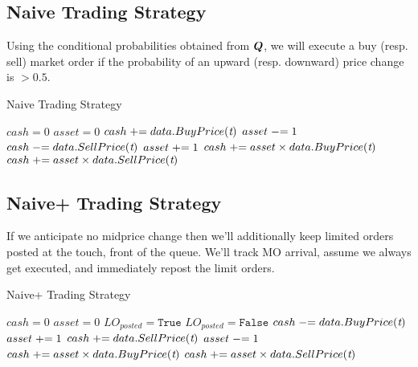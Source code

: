 \subsection{Naive Trading Strategy}  Using the conditional probabilities obtained from $\boldsymbol{Q}$, we will execute a buy (resp. sell) market order if the probability of an upward (resp. downward) price change is $> 0.5$.
\begin{algorithm}[H]
\caption{Naive Trading Strategy}
\begin{algorithmic}[1]
\State $cash = 0$
\State $asset = 0$
		\State $cash \mathrel{+}= data.BuyPrice(\textit{t})$
		\State $asset \mathrel{-}= 1$
		\State $cash \mathrel{-}= data.SellPrice(\textit{t})$	
		\State $asset \mathrel{+}= 1$
	\EndIf
\EndFor
{} 
	\State $cash \mathrel{+}= asset \times data.BuyPrice(\textit{t})$
	\State $cash \mathrel{+}= asset \times data.SellPrice(\textit{t})$	
\EndIf
\end{algorithmic}
\end{algorithm}

\subsection{Naive+ Trading Strategy} If we anticipate no midprice change then we'll additionally keep limited orders posted at the touch, front of the queue. We'll track MO arrival, assume we always get executed, and immediately repost the limit orders.
\begin{algorithm}[H]
\caption{Naive+ Trading Strategy}
\begin{algorithmic}[1]
\State $cash = 0$
\State $asset = 0$
		\State $LO_{posted} = \texttt{True}$
	\Else
		\State $LO_{posted} = \texttt{False}$
	\EndIf
				\State $cash \mathrel{-}= data.BuyPrice(\textit{t})$	
				\State $asset \mathrel{+}= 1$
				\State $cash \mathrel{+}= data.SellPrice(\textit{t})$
				\State $asset \mathrel{-}= 1$
			\EndIf
		\EndFor
	\EndIf
\EndFor
{} 
\State $cash \mathrel{+}= asset \times data.BuyPrice(\textit{t})$
\State $cash \mathrel{+}= asset \times data.SellPrice(\textit{t})$	
\EndIf
\end{algorithmic}
\end{algorithm}


